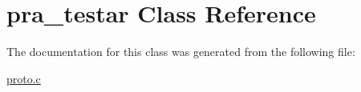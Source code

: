 \hypertarget{classpra__testar}{\section{pra\-\_\-testar Class Reference}
\label{classpra__testar}
}


The documentation for this class was generated from the following file\-:\begin{DoxyCompactItemize}
\item 
\hyperlink{proto_8c}{proto.\-c}\end{DoxyCompactItemize}
